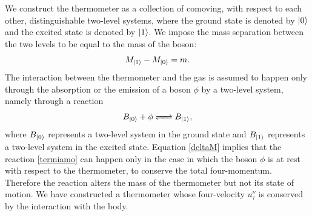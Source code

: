 \documentclass[twocolumn,usenatbib]{mnras2}
\begin{document}
We construct the thermometer as a collection of comoving, with respect to each other, distinguishable two-level systems, where the ground state is denoted by $\ket{0}$ and the excited state is denoted by $\ket{1}$.  We impose the mass separation between the two levels to be equal to the mass of the boson:
\begin{equation}\label{deltaM}
M_{\ket{1}}-M_{\ket{0}} =m.
\end{equation}
The interaction between the thermometer and the gas is assumed to happen only through the absorption or the emission of a boson $\phi$ by a two-level system, namely through a reaction
\begin{equation}\label{termiamo}
B_{\ket{0}} + \phi \ce{ <=> } B_{\ket{1}},
\end{equation}  
where $B_{\ket{0}}$ represents a two-level system in the ground state and $B_{\ket{1}}$ represents a two-level system in the excited state. Equation \eqref{deltaM} implies that the reaction \eqref{termiamo} can happen only in the case in which the boson $\phi$ is at rest with respect to the thermometer, 
to conserve the total four-momentum. Therefore the reaction alters the mass of the thermometer but not its state of motion. We have constructed a thermometer whose four-velocity $u_\tau^\nu$ is conserved by the interaction with the body. 
\end{document}
